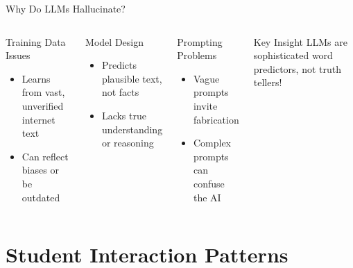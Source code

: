 \documentclass{beamer}
\begin{document}
\begin{frame}{Why Do LLMs Hallucinate?}
\begin{columns}
\begin{block}{Training Data Issues}
\begin{itemize}
\item Learns from vast, unverified internet text
\item Can reflect biases or be outdated
\end{itemize}
\end{block}
\pause 
\begin{block}{Model Design}
\begin{itemize}
\item Predicts plausible text, not facts
\item Lacks true understanding or reasoning
\end{itemize}
\end{block}
\pause 
\begin{block}{Prompting Problems}
\begin{itemize}
\item Vague prompts invite fabrication
\item Complex prompts can confuse the AI
\end{itemize}
\end{block}
\pause 
\begin{alertblock}{Key Insight}
LLMs are sophisticated word predictors, not truth tellers!
\end{alertblock}
\end{columns}
\end{frame}

\section{Student Interaction Patterns}
\end{document}
